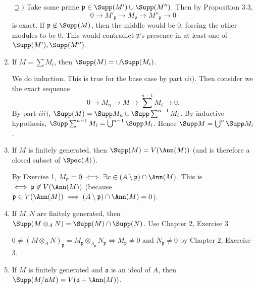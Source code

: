 \begin{questions}
\begin{enumerate}
\begin{solution}
		$\supseteq) $ Take some prime $\mathfrak{p} \in \Supp(M') \cup \Supp(M'')$.
		Then by Proposition 3.3,
		\[
			0 \to M'_{\mathfrak{p}} \to M_{\mathfrak{p}} \to M''_{\mathfrak{p}} \to 0
		\] 
		is exact.
		If $\mathfrak{p} \not\in\Supp(M)$, then the middle would be 0, forcing the other modules to be 0.
		This would contradict $\mathfrak{p} $'s presence in at least one of $\Supp(M'),\Supp(M'') $.
	\end{solution}
	\item If $M = \sum M_i $, then $\Supp(M) = \cup\Supp(M_i) $.
	\begin{solution}
		We do induction.
		This is true for the base case by part $iii) $.
		Then consider we the exact sequence
		\[
			0 \to M_{n} \to M \to \sum^{n-1} M_i \to 0
		.\] 
		By part $iii) $, $\Supp(M) = \Supp M_n \cup \Supp \sum^{n-1} M_i $.
		By inductive hypothesis, $\Supp \sum^{n-1} M_i = \bigcup^{n-1} \Supp M_i$.
		Hence $\Supp M = \bigcup^n \Supp M_i $.
	\end{solution}
	\item If $M $ is finitely generated, then $\Supp(M) = V(\Ann(M)) $ (and is therefore a closed subset of $\Spec(A) $).
	\begin{solution}
		By Exercise 1, $M_{\mathfrak{p}} = 0 \iff \exists x \in (A \setminus \mathfrak{p}) \cap \Ann(M) $.
		This is $\iff \mathfrak{p} \not \in V(\Ann(M)) $ (because $\mathfrak{p} \in V(\Ann(M)) \implies (A\setminus \mathfrak{p}) \cap \Ann(M) = 0 $).
	\end{solution}
	\item If $M,N $ are finitely generated, then $\Supp(M \otimes _A N) = \Supp(M) \cap \Supp(N)$.
		\ifhint
			Use Chapter 2, Exercise 3
		\fi
	\begin{solution}
		$0\ne (M \otimes_A N)_{\mathfrak{p}} = M_{\mathfrak{p}} \otimes_{A_{\mathfrak{p}}} N_{\mathfrak{p}} \iff M_{\mathfrak{p}} \ne 0$ and $N_{\mathfrak{p}} \ne 0 $ by Chapter 2, Exercise 3.
	\end{solution}
	\item If $M $ is finitely generated and $\mathfrak{a} $ is an ideal of $A $, then $\Supp(M / \mathfrak{a}M) = V(\mathfrak{a} + \Ann(M)) $.

\end{enumerate}
\end{questions}
